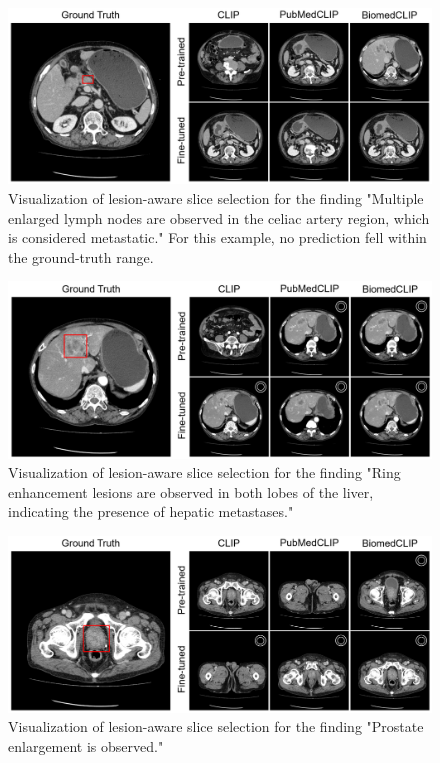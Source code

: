 \documentclass[bioengineering,article,submit,pdftex,moreauthors]{Definitions/mdpi}
\begin{document}
\begin{figure}[ht]
  \centering
  \includegraphics[width=1\textwidth]{./figures/app_lesion_aware_inst7_2.png}
  \caption{Visualization of lesion-aware slice selection for the finding 
  "Multiple enlarged lymph nodes are observed in the celiac artery region, which is considered metastatic."
  For this example, no prediction fell within the ground-truth range.}
  \label{fig:lesion_aware_inst7}
\end{figure}


\begin{figure}[ht]
  \centering
  \includegraphics[width=1\textwidth]{./figures/app_lesion_aware_inst8_2.png}
  \caption{Visualization of lesion-aware slice selection for the finding 
  "Ring enhancement lesions are observed in both lobes of the liver, indicating the presence of hepatic metastases."}
  \label{fig:lesion_aware_inst8}
\end{figure}


\begin{figure}[ht]
  \centering
  \includegraphics[width=1\textwidth]{./figures/app_lesion_aware_inst10_2.png}
  \caption{Visualization of lesion-aware slice selection for the finding "Prostate enlargement is observed."}
  \label{fig:lesion_aware_inst10}
\end{figure}
\end{document}
